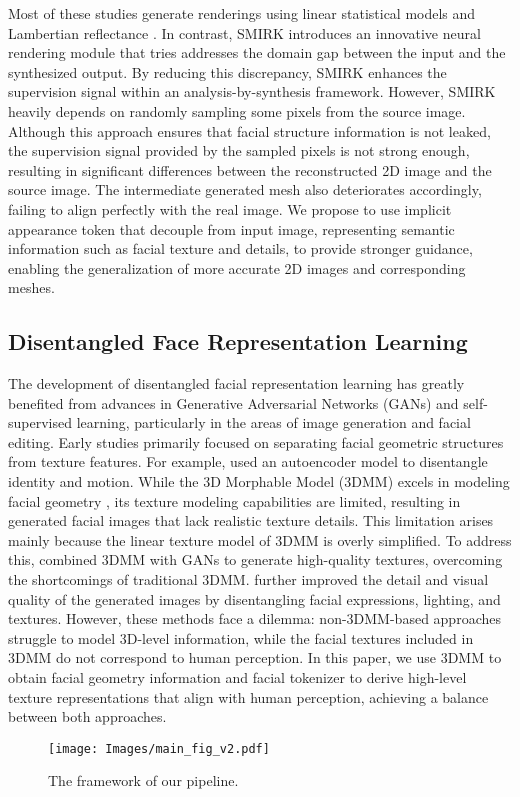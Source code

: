 Most of these studies generate renderings using linear statistical models and Lambertian reflectance \cite{lambertian}. In contrast, SMIRK introduces an innovative neural rendering module that tries addresses the domain gap between the input and the synthesized output. By reducing this discrepancy, SMIRK enhances the supervision signal within an analysis-by-synthesis framework. 
However, SMIRK heavily depends on randomly sampling some pixels from the source image. Although this approach ensures that facial structure information is not leaked, the supervision signal provided by the sampled pixels is not strong enough, resulting in significant differences between the reconstructed 2D image and the source image. The intermediate generated mesh also deteriorates accordingly, failing to align perfectly with the real image. We propose to use implicit appearance token that decouple from input image, representing semantic information such as facial texture and details, to provide stronger guidance, enabling the generalization of more accurate 2D images and corresponding meshes.


\subsection{Disentangled Face Representation Learning}
The development of disentangled facial representation learning  \cite{Infogan,beta-vae,orthogonal} has greatly benefited from advances in Generative Adversarial Networks (GANs) and self-supervised learning, particularly in the areas of image generation and facial editing. Early studies primarily focused on separating facial geometric structures from texture features. For example, \cite{liu2015deep, LIA, face2facevid} used an autoencoder model to disentangle identity and motion. While the 3D Morphable Model (3DMM) excels in modeling facial geometry \cite{PIRenderer}, its texture modeling capabilities are limited, resulting in generated facial images that lack realistic texture details. This limitation arises mainly because the linear texture model of 3DMM is overly simplified. To address this, \cite{Mofa, StyleHEAT} combined 3DMM with GANs to generate high-quality textures, overcoming the shortcomings of traditional 3DMM. \cite{Deep3DReconstruct} further improved the detail and visual quality of the generated images by disentangling facial expressions, lighting, and textures. However, these methods face a dilemma: non-3DMM-based approaches struggle to model 3D-level information, while the facial textures included in 3DMM do not correspond to human perception. In this paper, we use 3DMM to obtain facial geometry information and facial tokenizer to derive high-level texture representations that align with human perception, achieving a balance between both approaches.


\begin{figure}[tp]
\centering
\texttt{[image: Images/main\_fig\_v2.pdf]}
\vspace{-1.5em}
\caption{The framework of our pipeline.}
\vspace{-.5em}
\label{fig:overal_arch}
\end{figure}